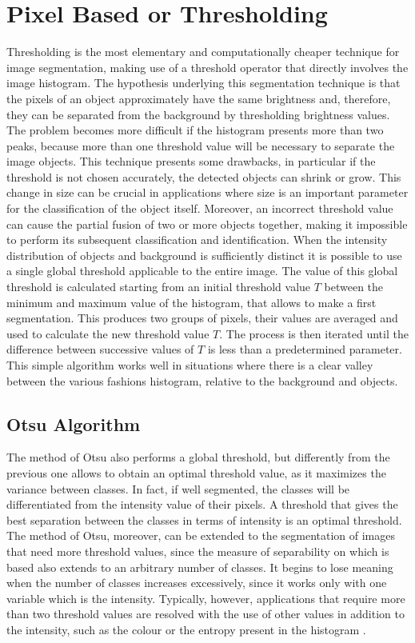 \documentclass[final,a4paper,12pt,english]{UnicaPhdThesis3}
\begin{document}
	\section{Pixel Based or Thresholding} %
	Thresholding is the most elementary and computationally cheaper technique for image segmentation, making use of a threshold operator that directly involves the image histogram. The hypothesis underlying this segmentation technique is that the pixels of an object approximately have the same brightness and, therefore, they can be separated from the background by thresholding brightness values. The problem becomes more difficult if the histogram presents more than two peaks, because more than one threshold value will be necessary to separate the image objects. This technique presents some drawbacks, in particular if the threshold is not chosen accurately, the detected objects can shrink or grow. This change in size can be crucial in applications where size is an important parameter for the classification of the object itself. Moreover, an incorrect threshold value can cause the partial fusion of two or more objects together, making it impossible to perform its subsequent classification and identification. When the intensity distribution of objects and background is sufficiently distinct it is possible to use a single global threshold \cite{Gonz, GonzMAT} applicable to the entire image. The value of this global threshold is calculated starting from an initial threshold value $T$ between the minimum and maximum value of the histogram, that allows to make a first segmentation. This produces two groups of pixels, their values are averaged and used to calculate the new threshold value $T$. The process is then iterated until the difference between successive values of $T$ is less than a predetermined parameter. This simple algorithm works well in situations where there is a clear valley between the various fashions histogram, relative to the background and objects.
	
	\subsection{Otsu Algorithm} \label{Otsu} %
	The method of Otsu \cite{Otsu} also performs a global threshold, but differently from the previous one allows to obtain an optimal threshold value, as it maximizes the variance between classes. In fact, if well segmented, the classes will be differentiated from the intensity value of their pixels. A threshold that gives the best separation between the classes in terms of intensity is an optimal threshold. The method of Otsu, moreover, can be extended to the segmentation of images that need more threshold values, since the measure of separability on which is based also extends to an arbitrary number of classes. It begins to lose meaning when the number of classes increases excessively, since it works only with one variable which is the intensity. Typically, however, applications that require more than two threshold values are resolved with the use of other values in addition to the intensity, such as the colour or the entropy present in the histogram \cite{Kapur}.
	
\end{document}
